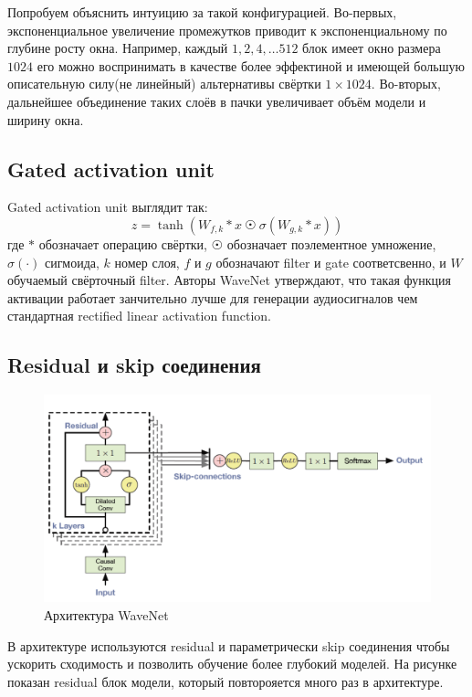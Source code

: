 \documentclass[../diploma.tex]{subfiles}
\begin{document}
Попробуем объяснить интуицию за такой конфигурацией. Во-первых, экспоненциальное увеличение промежутков приводит к экспоненциальному по глубине росту окна. \cite{arxiv:yu-fisher} Например, каждый $1,2,4, \dots 512$ блок имеет окно размера $1024$ его можно воспринимать в качестве более эффектиной и имеющей большую описательную силу(не линейный) альтернативы свёртки $1 \times 1024$. Во-вторых, дальнейшее объединение таких слоёв в пачки увеличивает объём модели и ширину окна.

\newpage
\subsection{Gated activation unit}
Gated activation unit выглядит так:
$$z = \tanh(W_{f,k} * x \  \astrosun \  \sigma(W_{g,k} * x))$$
где $*$ обозначает операцию свёртки, $\astrosun$ обозначает поэлементное умножение, $\sigma(\cdot)$ сигмоида, $k$ номер слоя, $f$ и $g$ обозначают filter и gate соответсвенно, и $W$ обучаемый свёрточный filter. Авторы WaveNet утверждают, что такая функция активации работает занчительно лучше для генерации аудиосигналов чем стандартная rectified linear activation function.

\subsection{Residual и skip соединения}

\begin{figure}[h!]
  \includegraphics[scale=0.4]{img/wavenet}
  \caption{Архитектура WaveNet}
  \label{fig:wavenet_arch}
\end{figure}

В архитектуре используются residual и параметрически skip соединения чтобы ускорить сходимость и позволить обучение более глубокий моделей. На рисунке показан residual блок модели, который повторояется много раз в архитектуре. 
\end{document}
